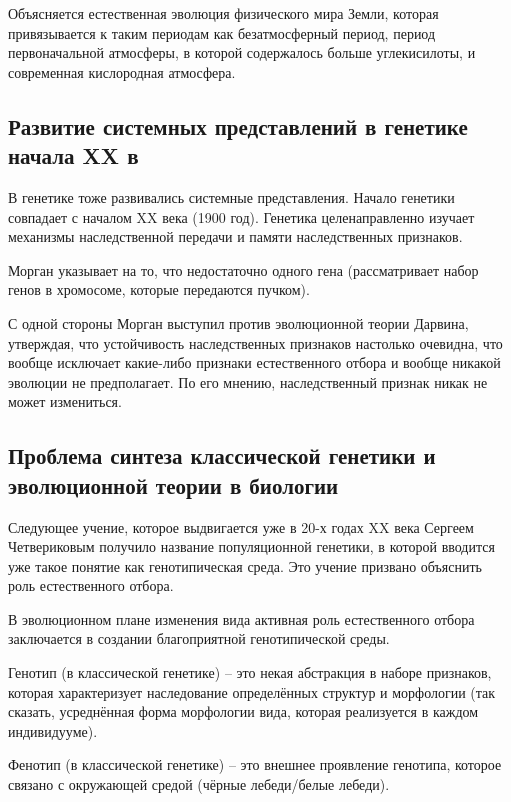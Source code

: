\documentclass[main.tex]{subfiles}
\begin{document}
Объясняется естественная эволюция физического мира Земли, которая привязывается к таким периодам как безатмосферный период, период первоначальной атмосферы, в которой содержалось больше углекисилоты, и современная кислородная атмосфера.

\subsection{Развитие системных представлений в генетике начала XX в}


В генетике тоже развивались системные представления.
Начало генетики совпадает с началом XX века (1900 год).
Генетика целенаправленно изучает механизмы наследственной передачи и памяти наследственных признаков.

Морган указывает на то, что недостаточно одного гена (рассматривает набор генов в хромосоме, которые передаются пучком).

С одной стороны Морган выступил против эволюционной теории Дарвина, утверждая, что устойчивость наследственных признаков настолько очевидна, что вообще исключает какие-либо признаки естественного отбора и вообще никакой эволюции не предполагает.
По его мнению, наследственный признак никак не может измениться.

\subsection{Проблема синтеза классической генетики и эволюционной теории в биологии}


Следующее учение, которое выдвигается уже в 20-х годах XX века Сергеем Четвериковым получило название популяционной генетики, в которой вводится уже такое понятие как генотипическая среда.
Это учение призвано объяснить роль естественного отбора.

В эволюционном плане изменения вида активная роль естественного отбора заключается в создании благоприятной генотипической среды.

Генотип (в классической генетике) -- это некая абстракция в наборе признаков, которая характеризует наследование определённых структур и морфологии (так сказать, усреднённая форма морфологии вида, которая реализуется в каждом индивидууме).

Фенотип (в классической генетике) -- это внешнее проявление генотипа, которое связано с окружающей средой (чёрные лебеди/белые лебеди).
\end{document}
